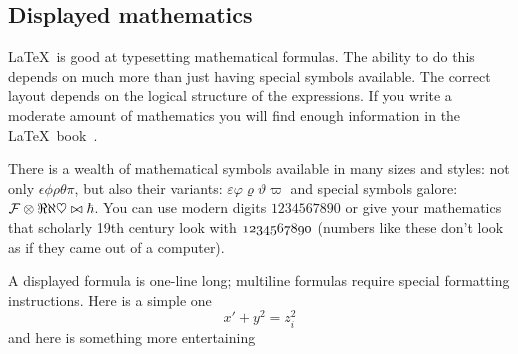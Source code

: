 \documentclass{cernatsreport}    %
\begin{document}
\subsection{Displayed mathematics}

\LaTeX\ is good at typesetting mathematical
formulas. The ability to do this depends on much more than just having
special symbols available. The correct layout depends on the logical
structure of the expressions. If you write a moderate amount of
mathematics you will find enough information in the \LaTeX\
book~\cite{Lamport}.  

There is a wealth of mathematical symbols available in many sizes and
styles: not only
$\epsilon\phi\rho\theta\pi$,
but also their variants:
                 $\varepsilon\varphi\varrho\vartheta\varpi$
and special symbols galore:
${\cal F} \otimes \Re \aleph \heartsuit\bowtie\hbar$.
You can use modern digits   $1234567890$ or give your mathematics
that scholarly 19th century look with $\mit 1234567890$ (numbers
like these don't look as if they came out of a computer).

A displayed formula is one-line long; multiline formulas require special
formatting instructions.  Here is a simple one
\begin{equation}
   x' + y^{2} = z_{i}^{2}
\label{simpleone}  %
\end{equation}
and here is something more entertaining 
\end{document}
